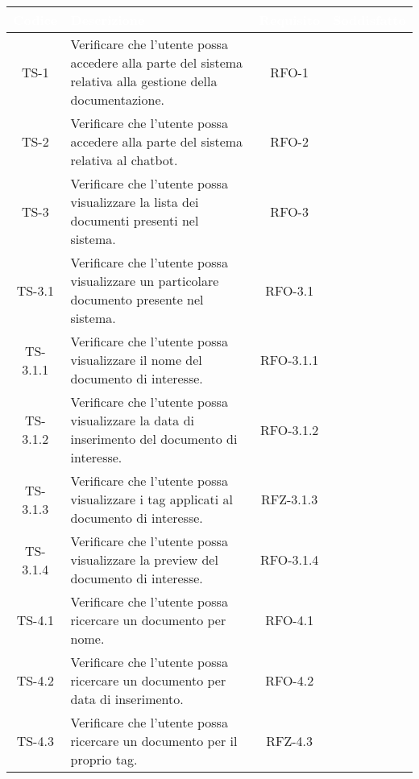 \begingroup
\setlength{\tabcolsep}{10pt}
\renewcommand{\arraystretch}{1.5}
\begin{xltabular}{\textwidth}{| c | X | c | c |}
    \hline
     \textbf{\textcolor{white}{Codice}} & \textbf{\textcolor{white}{Descrizione}} & \textbf{\textcolor{white}{Requisito}} & \textbf{\textcolor{white}{Soddisfatto}}\\
    \hline
    \endhead
    TS-1 & Verificare che l’utente possa accedere alla parte del sistema relativa alla gestione della documentazione. & RFO-1 & \textcolor{xmarkcolor}{} \\
    \hline
    TS-2 & Verificare che l’utente possa accedere alla parte del sistema relativa al chatbot. & RFO-2 & \textcolor{xmarkcolor}{} \\
    \hline
    TS-3 & Verificare che l’utente possa visualizzare la lista dei documenti presenti nel sistema. & RFO-3 & \textcolor{xmarkcolor}{} \\
    \hline
    TS-3.1 & Verificare che l’utente possa visualizzare un particolare documento presente nel sistema. & RFO-3.1 & \textcolor{xmarkcolor}{} \\
    \hline
    TS-3.1.1 & Verificare che l'utente possa visualizzare il nome del documento di interesse. & RFO-3.1.1 & \textcolor{xmarkcolor}{} \\
    \hline
    TS-3.1.2 & Verificare che l’utente possa visualizzare la data di inserimento del documento di interesse. & RFO-3.1.2 & \textcolor{xmarkcolor}{} \\
    \hline
    TS-3.1.3 & Verificare che l’utente possa visualizzare i tag applicati al documento di interesse. & RFZ-3.1.3 & \textcolor{xmarkcolor}{} \\
    \hline
    TS-3.1.4 & Verificare che l’utente possa visualizzare la preview del documento di interesse. & RFO-3.1.4 & \textcolor{xmarkcolor}{} \\
    \hline
    TS-4.1 & Verificare che l’utente possa ricercare un documento per nome. & RFO-4.1 & \textcolor{xmarkcolor}{} \\
    \hline
    TS-4.2 & Verificare che l’utente possa ricercare un documento per data di inserimento. & RFO-4.2 & \textcolor{xmarkcolor}{} \\
    \hline
    TS-4.3 &  Verificare che l’utente possa ricercare un documento per il proprio tag. & RFZ-4.3 & \textcolor{xmarkcolor}{} \\

\end{xltabular}
